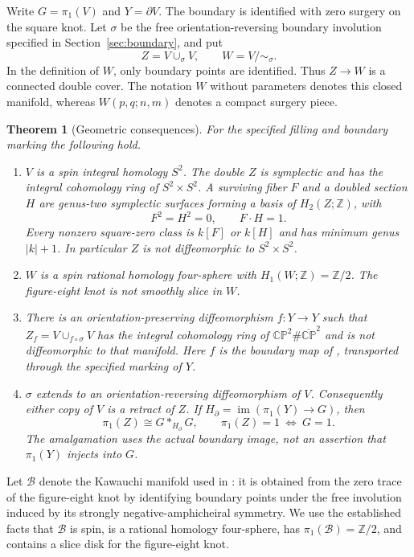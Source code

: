 \documentclass[11pt]{amsart}
\newtheorem{theorem}{Theorem}[section]
\theoremstyle{definition}
\theoremstyle{remark}
\newcommand{\Z}{\mathbb Z}
\newcommand{\CP}{\mathbb{CP}}
\newcommand{\bCP}{\overline{\mathbb{CP}}}
\newcommand{\BK}{\mathcal B}
\begin{document}
Write $G=\pi_1(V)$ and $Y=\partial V$. The boundary is identified with
zero surgery on the square knot. Let $\sigma$ be the free
orientation-reversing boundary involution specified in
Section~\ref{sec:boundary}, and put
\[
             Z=V\cup_\sigma V,\qquad W=V/{\sim_\sigma}.
\]
In the definition of $W$, only boundary points are identified. Thus
$Z\to W$ is a connected double cover. The notation $W$ without
parameters denotes this closed manifold, whereas $W(p,q;n,m)$ denotes
a compact surgery piece.

\begin{theorem}[Geometric consequences]\label{thm:geometric}
For the specified filling and boundary marking the following hold.
\begin{enumerate}
\item $V$ is a spin integral homology $S^2$. The double $Z$ is symplectic
and has the integral cohomology ring of $S^2\times S^2$. A surviving
fiber $F$ and a doubled section $H$ are genus-two symplectic surfaces
forming a basis of $H_2(Z;\Z)$, with
\[
                      F^2=H^2=0,\qquad F\cdot H=1.
\]
Every nonzero square-zero class is $k[F]$ or $k[H]$ and has minimum
genus $|k|+1$. In particular $Z$ is not diffeomorphic to $S^2\times S^2$.
\item $W$ is a spin rational homology four-sphere with
$H_1(W;\Z)=\Z/2$. The figure-eight knot is not smoothly slice in $W$.
\item There is an orientation-preserving diffeomorphism $f:Y\to Y$
such that $Z_f=V\cup_{f\circ\sigma}V$ has the integral cohomology ring
of $\CP^2\#\bCP^2$ and is not diffeomorphic to that manifold.
Here $f$ is the boundary map of \cite[Figure 3]{LP25}, transported
through the specified marking of $Y$.
\item $\sigma$ extends to an orientation-reversing diffeomorphism of
$V$. Consequently either copy of $V$ is a retract of $Z$. If
$H_\partial=\operatorname{im}(\pi_1(Y)\to G)$, then
\[
              \pi_1(Z)\cong G*_{H_\partial}G,
       \qquad \pi_1(Z)=1\ \Longleftrightarrow\ G=1.
\]
The amalgamation uses the actual boundary image, not an assertion that
$\pi_1(Y)$ injects into $G$.
\end{enumerate}
\end{theorem}

Let $\BK$ denote the Kawauchi manifold used in \cite{LP25}: it is
obtained from the zero trace of the figure-eight knot by identifying
boundary points under the free involution induced by its strongly
negative-amphicheiral symmetry. We use the established facts that
$\BK$ is spin, is a rational homology four-sphere, has
$\pi_1(\BK)=\Z/2$, and contains a slice disk for the figure-eight knot.
\end{document}
